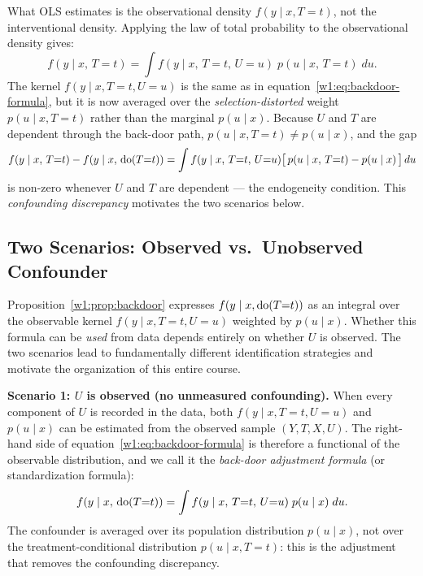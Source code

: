 \documentclass[master.tex]{subfiles}
\begin{document}
\begin{remark}
\label{w1:rem:discrepancy}
What OLS estimates is the observational density $f(y \mid x, T{=}t)$,
not the interventional density.  Applying the law of total probability
to the observational density gives:
\[
  f(y \mid x,\, T{=}t)
  = \int f(y \mid x,\, T{=}t,\, U{=}u)\; p(u \mid x,\, T{=}t)\; du.
\]
The kernel $f(y \mid x, T{=}t, U{=}u)$ is the same as in
equation~\eqref{w1:eq:backdoor-formula}, but it is now averaged over
the \emph{selection-distorted} weight $p(u \mid x, T{=}t)$ rather than
the marginal $p(u \mid x)$.  Because $U$ and $T$ are dependent through the
back-door path, $p(u \mid x, T{=}t) \neq p(u \mid x)$, and the gap
\[
  f(y \mid x,\, T{=}t) - f(y \mid x,\, \mathrm{do}(T{=}t))
  = \int f(y \mid x,\, T{=}t,\, U{=}u)
    \bigl[\, p(u \mid x,\, T{=}t) - p(u \mid x) \,\bigr]\, du
\]
is non-zero whenever $U$ and $T$ are dependent --- the endogeneity
condition.  This \emph{confounding discrepancy} motivates the two
scenarios below.
\end{remark}

\subsection{Two Scenarios: Observed vs.\ Unobserved Confounder}

Proposition~\ref{w1:prop:backdoor} expresses $f(y \mid x, \mathrm{do}(T{=}t))$
as an integral over the observable kernel $f(y \mid x, T{=}t, U{=}u)$
weighted by $p(u \mid x)$.  Whether this formula can be \emph{used} from
data depends entirely on whether $U$ is observed.  The two scenarios lead
to fundamentally different identification strategies and motivate the
organization of this entire course.

\medskip
\noindent\textbf{Scenario 1: $U$ is observed (no unmeasured confounding).}
When every component of $U$ is recorded in the data, both
$f(y \mid x, T{=}t, U{=}u)$ and $p(u \mid x)$ can be estimated from the
observed sample $(Y, T, X, U)$.  The right-hand side of
equation~\eqref{w1:eq:backdoor-formula} is therefore a functional of the
observable distribution, and we call it the \emph{back-door adjustment
formula} (or standardization formula):
\begin{equation}
  f(y \mid x,\, \mathrm{do}(T{=}t))
  = \int f(y \mid x,\, T{=}t,\, U{=}u)\; p(u \mid x)\; du.
  \label{w1:eq:backdoor-cont}
\end{equation}
The confounder is averaged over its population distribution $p(u \mid x)$,
not over the treatment-conditional distribution $p(u \mid x, T{=}t)$:
this is the adjustment that removes the confounding discrepancy.
\end{document}
